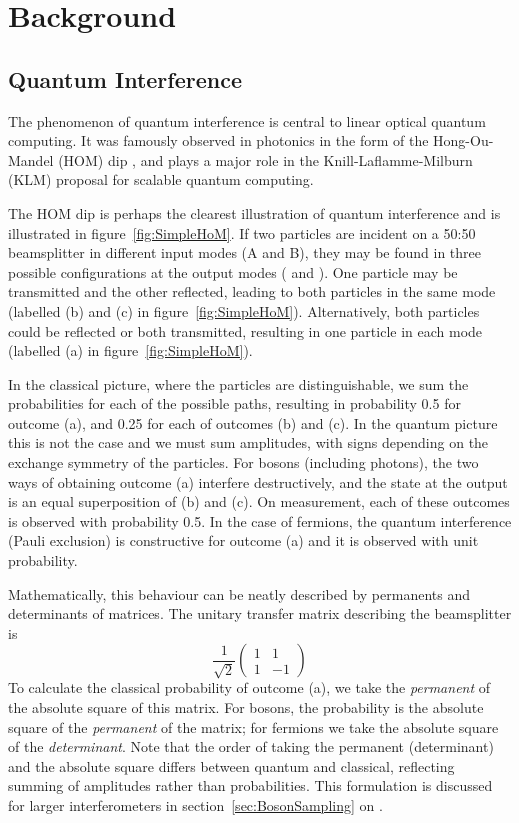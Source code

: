 \chapter{Background}
\label{ch:Background}
\section{Quantum Interference}
\label{sec:HOM}
The phenomenon of quantum interference is central to linear optical quantum
computing. It was famously observed in photonics in the form of the
Hong-Ou-Mandel (HOM) dip \cite{hom}, and plays a major role in the
Knill-Laflamme-Milburn (KLM) proposal for scalable quantum computing.

The HOM
dip is perhaps the clearest illustration of quantum interference and is
illustrated in figure~\ref{fig:SimpleHoM}. If two particles are incident on a
50:50 beamsplitter in different input modes (A and B), they may be found in
three possible configurations at the output modes (\aprime{} and \bprime{}). One
particle may be transmitted and the other reflected, leading to both particles
in the same mode (labelled (b) and (c) in figure~\ref{fig:SimpleHoM}).
Alternatively, both particles could be reflected or both transmitted, resulting
in one particle in each mode (labelled (a) in figure~\ref{fig:SimpleHoM}).

In the classical picture, where the particles are distinguishable, we sum the
probabilities for each of the possible paths, resulting in probability 0.5 for
outcome (a), and 0.25 for each of outcomes (b) and (c). In the quantum picture
this is not the case and we must sum amplitudes, with signs depending on the
exchange symmetry of the particles. For bosons (including photons), the two ways
of obtaining outcome (a) interfere destructively, and the state at the output is
an equal superposition of (b) and (c). On measurement, each of these outcomes is
observed with probability 0.5. In the case of fermions, the quantum interference
(Pauli exclusion) is constructive for outcome (a) and it is observed with unit
probability.

Mathematically, this behaviour can be neatly described by permanents and
determinants of matrices. The unitary transfer matrix describing the
beamsplitter is
\begin{equation}
  \frac{1}{\sqrt{2}} \begin{pmatrix} 1 & 1 \\ 1 & -1 \end{pmatrix}
\end{equation}
To calculate the classical probability of outcome (a), we take the
\emph{permanent} of the absolute square of this matrix. For bosons, the
probability is the absolute square of the \emph{permanent} of the matrix; for
fermions we take the absolute square of the \emph{determinant}. Note that the
order of taking the permanent (determinant) and the absolute square differs
between quantum and classical, reflecting summing of amplitudes rather than
probabilities. This formulation is discussed for larger interferometers in
section~\ref{sec:BosonSampling} on \bosonsampling{}.

